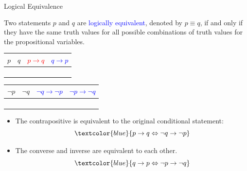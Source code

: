\documentclass[aspectratio=169]{beamer}
\providecommand{\Blue}[1]{\textcolor{blue}{#1}}
\providecommand{\Red}[1]{\textcolor{red}{#1}}
\begin{document}
\begin{frame}[plain]{Logical Equivalence}


 Two statements $p$ and $q$ are  \Blue{logically equivalent}, denoted by $p\equiv q$, 
 if and only if they have the same truth values for all possible combinations of truth values 
 for the propositional variables. \pause 
 
  \begin{center}
        \begin{tabular}{|c|c|c|c|}\hline
          $p$ & $q$ & \Red{$p \rightarrow q$} &  \Blue{$q \rightarrow p$} \\ \hline
            	&   &  & \\ \hline
               &     &  &\\ \hline 
               &     &  &\\ \hline
               &     &  &\\ \hline
        \end{tabular}
        \begin{tabular}{|c|c|c|c|}\hline
          $\neg p$ & $\neg q$ & \Blue{$\neg q \rightarrow \neg p$} &  \Blue{$\neg p \rightarrow \neg q$}\\ \hline
           &   & & \\ \hline
           &  &  &\\ \hline 
           &  & &  \\ \hline
           &  &  &\\ \hline
        \end{tabular}
  \end{center} 
 \pause 
 
 \begin{itemize}
   \item The contrapositive is equivalent to the original conditional statement:
      \[ \Blue{p\rightarrow q \Leftrightarrow \neg q\rightarrow \neg p}\]
   \item The converse and inverse are equivalent to each other.
     \[ \Blue{q\rightarrow p \Leftrightarrow \neg p\rightarrow \neg q}\]
  \end{itemize}
  
\end{frame}
\end{document}
